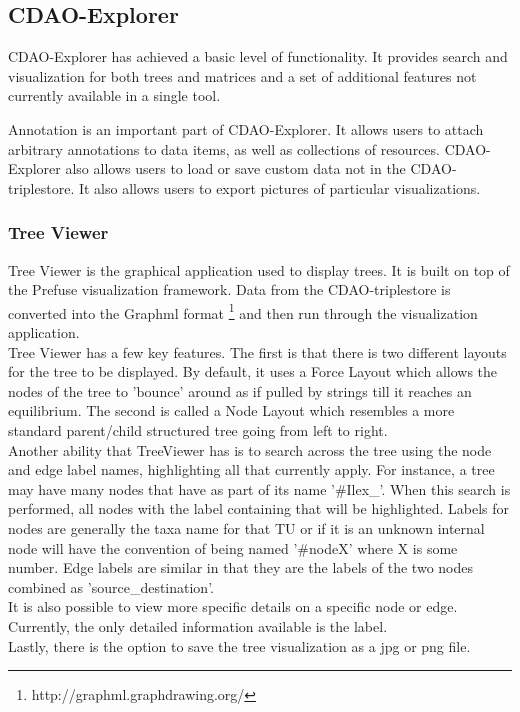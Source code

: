 \documentclass[10pt]{bmc_article}
\newenvironment{bmcformat}{\begin{raggedright}\baselineskip20pt\sloppy\setboolean{publ}{false}}{\end{raggedright}\baselineskip20pt\sloppy}
\begin{document}
\begin{bmcformat}
  
  \subsection*{CDAO-Explorer}
  CDAO-Explorer has achieved a basic level of functionality. It provides search
and visualization for both trees and matrices and a set of additional features
not currently available in a single tool. 
  
  Annotation is an important part of CDAO-Explorer. It allows users to attach
arbitrary annotations to data items, as well as collections of resources.
CDAO-Explorer also allows users to load or save custom data not in the
CDAO-triplestore. It also allows users to export pictures of particular
visualizations. 

\subsubsection*{Tree Viewer}
Tree Viewer is the graphical application used to display trees.  It is built on
top of the Prefuse visualization framework. Data from the CDAO-triplestore is
converted into the Graphml format \footnote{http://graphml.graphdrawing.org/}
and then run through the visualization application.  \\ Tree Viewer has a few
key features.  The first is that there is two different layouts for the tree to
be displayed.  By default, it uses a Force Layout which allows the nodes of the
tree to 'bounce' around as if pulled by strings till it reaches an equilibrium.
The second is called a Node Layout which resembles a more standard parent/child
structured tree going from left to right.  \\ Another ability that TreeViewer
has is to search across the tree using the node and edge label names,
highlighting all that currently apply.  For instance, a tree may have many
nodes that have as part of its name '\#Ilex\_'.  When this search is performed,
all nodes with the label containing that will be highlighted.  Labels for nodes
are generally the taxa name for that TU or if it is an unknown internal node
will have the convention of being named '\#nodeX' where X is some number.  Edge
labels are similar in that they are the labels of the two nodes combined as
'source\_destination'.  \\ 
It is also possible to view more specific details on
a specific node or edge.  Currently, the only detailed information available is
the label.  \\
 Lastly, there is the option to save the tree visualization as a
jpg or png file.  


\end{bmcformat}
\end{document}
